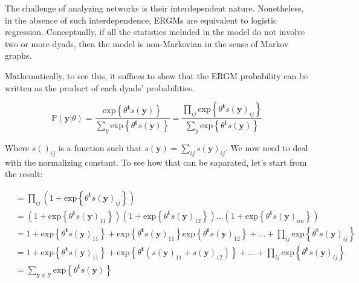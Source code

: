 \documentclass[]{book}
\begin{document}
The challenge of analyzing networks is their interdependent nature. Nonetheless, in the absence of such interdependence, ERGMs are equivalent to logistic regression. Conceptually, if all the statistics included in the model do not involve two or more dyads, then the model is non-Markovian in the sense of Markov graphs.

Mathematically, to see this, it suffices to show that the ERGM probability can be written as the product of each dyads' probabilities.

\begin{equation*}
{\mathbb{P}\left(\mathbf{y} | \theta\right) } = \frac{\mbox{exp}\left\{{\theta}^\mathbf{t}s\left(\mathbf{y}\right)\right\}}{\sum_{y}\mbox{exp}\left\{{\theta}^\mathbf{t}s\left(\mathbf{y}\right)\right\}} 
= \frac{\prod_{ij}\mbox{exp}\left\{{\theta}^\mathbf{t}s\left(\mathbf{y}\right)_{ij}\right\}}{\sum_{y}\mbox{exp}\left\{{\theta}^\mathbf{t}s\left(\mathbf{y}\right)\right\}}
\end{equation*}

Where \(s\left(\right)_{ij}\) is a function such that \(s\left(\mathbf{y}\right) = \sum_{ij}{s\left(\mathbf{y}\right)_{ij}}\). We now need to deal with the normalizing constant. To see how that can be saparated, let's start from the result:

\newcommand{\thetaS}[1]{\exp{\transpose{\theta}\s{\mathbf{y}}_{#1}}}

\begin{align*}
& =\prod_{ij}\left(1 + \mbox{exp}\left\{{\theta}^\mathbf{t}s\left(\mathbf{y}\right)_{ij}\right\}\right) \\
& = \left(1 + \mbox{exp}\left\{{\theta}^\mathbf{t}s\left(\mathbf{y}\right)_{11}\right\}\right)\left(1 + \mbox{exp}\left\{{\theta}^\mathbf{t}s\left(\mathbf{y}\right)_{12}\right\}\right)\dots\left(1 + \mbox{exp}\left\{{\theta}^\mathbf{t}s\left(\mathbf{y}\right)_{nn}\right\}\right) \\
& = 1 + \mbox{exp}\left\{{\theta}^\mathbf{t}s\left(\mathbf{y}\right)_{11}\right\} + \mbox{exp}\left\{{\theta}^\mathbf{t}s\left(\mathbf{y}\right)_{11}\right\}\mbox{exp}\left\{{\theta}^\mathbf{t}s\left(\mathbf{y}\right)_{12}\right\} + \dots + \prod_{ij}\mbox{exp}\left\{{\theta}^\mathbf{t}s\left(\mathbf{y}\right)_{ij}\right\} \\
& = 1 + \mbox{exp}\left\{{\theta}^\mathbf{t}s\left(\mathbf{y}\right)_{11}\right\} + \mbox{exp}\left\{{\theta}^\mathbf{t}\left(s\left(\mathbf{y}\right)_{11} + s\left(\mathbf{y}\right)_{12}\right)\right\} + \dots + \prod_{ij}\mbox{exp}\left\{{\theta}^\mathbf{t}s\left(\mathbf{y}\right)_{ij}\right\} \\
& = \sum_{\mathbf{y}\in\mathcal{Y}}\mbox{exp}\left\{{\theta}^\mathbf{t}s\left(\mathbf{y}\right)\right\}
\end{align*}
\end{document}
